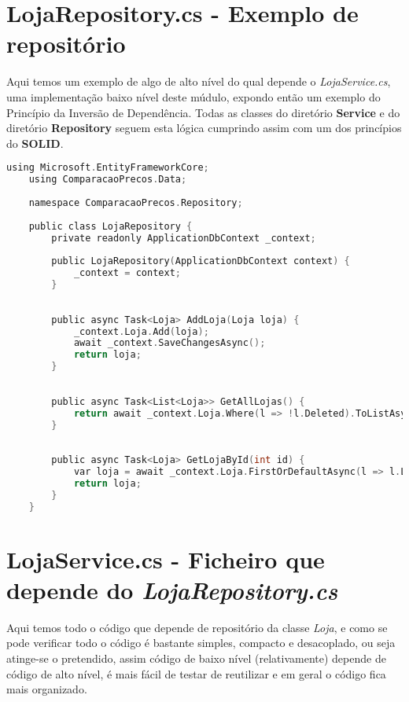 \documentclass[12pt]{article}
\begin{document}
\section*{LojaRepository.cs - Exemplo de repositório}

Aqui temos um exemplo de algo de alto nível do qual 
depende o \textit{LojaService.cs}, uma implementação baixo nível deste múdulo, expondo então
um exemplo do Princípio da Inversão de Dependência. Todas as classes do diretório 
\textbf{Service} e do diretório \textbf{Repository} seguem esta lógica cumprindo assim com 
um dos princípios do \textbf{SOLID}.

\begin{lstlisting}[language=C,caption={LojaRepository.cs}]
    using Microsoft.EntityFrameworkCore;
    using ComparacaoPrecos.Data;
    
    namespace ComparacaoPrecos.Repository;
    
    public class LojaRepository {
        private readonly ApplicationDbContext _context;
    
        public LojaRepository(ApplicationDbContext context) {
            _context = context;
        }
    
        
        public async Task<Loja> AddLoja(Loja loja) {
            _context.Loja.Add(loja);
            await _context.SaveChangesAsync();
            return loja;
        }
    
        
        public async Task<List<Loja>> GetAllLojas() {
            return await _context.Loja.Where(l => !l.Deleted).ToListAsync();
        }
    
        
        public async Task<Loja> GetLojaById(int id) {
            var loja = await _context.Loja.FirstOrDefaultAsync(l => l.LojaID == id && !l.Deleted) ?? throw new KeyNotFoundException($"Loja with ID {id} not found or is deleted.");
            return loja;
        }
    }
\end{lstlisting}

\vspace{0.5cm}

\section*{LojaService.cs - Ficheiro que depende do \textit{LojaRepository.cs}}

Aqui temos todo o código que depende de repositório da classe \textit{Loja}, 
e como se pode verificar todo o código é bastante simples, compacto e desacoplado, ou seja atinge-se o 
pretendido, assim código de baixo nível (relativamente) depende de código de alto nível, é mais fácil de testar
 de reutilizar e em geral o código fica mais organizado.
\end{document}
